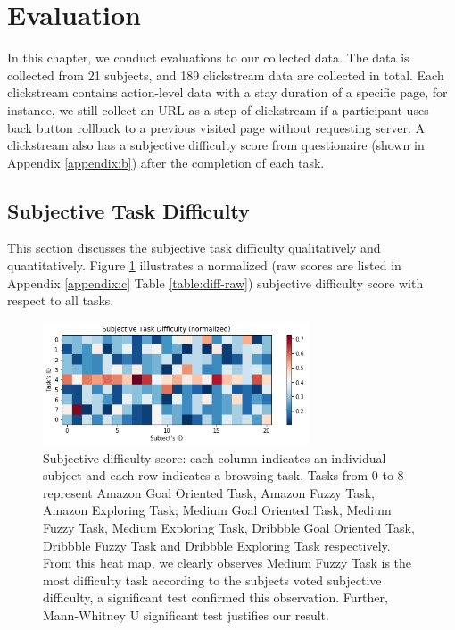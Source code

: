 \section{Evaluation}
\label{ch:eval}

In this chapter, we conduct evaluations to our collected data.
The data is collected from 21 subjects, and 189 clickstream data are collected in total. 
Each clickstream contains action-level data with a stay duration
of a specific page, for instance, we still collect an URL as a step of clickstream 
if a participant uses back button rollback to a previous visited page without requesting server. 
A clickstream also has a subjective difficulty score from questionaire (shown in Appendix \ref{appendix:b}) 
after the completion of each task.

\subsection{Subjective Task Difficulty}

This section discusses the subjective task difficulty qualitatively and quantitatively.
Figure \ref{fig:difficulty} illustrates a normalized (raw scores are listed in 
Appendix \ref{appendix:c} Table \ref{table:diff-raw}) subjective difficulty score 
with respect to all tasks.

\begin{figure}[H]
    \centering
    \includegraphics[width=0.7\textwidth]{figures/difficulty}
    \caption{Subjective difficulty score: each column indicates an individual subject and
    each row indicates a browsing task. Tasks from 0 to 8 represent Amazon Goal Oriented Task,
    Amazon Fuzzy Task, Amazon Exploring Task; Medium Goal Oriented Task, Medium Fuzzy Task,
    Medium Exploring Task, Dribbble Goal Oriented Task, Dribbble Fuzzy Task and Dribbble Exploring Task
    respectively.
    From this heat map, we clearly observes Medium Fuzzy Task is the most difficulty task
    according to the subjects voted subjective difficulty, a significant test confirmed this observation.
    Further, Mann-Whitney U significant test justifies our result.}
    \label{fig:difficulty}
\end{figure}


